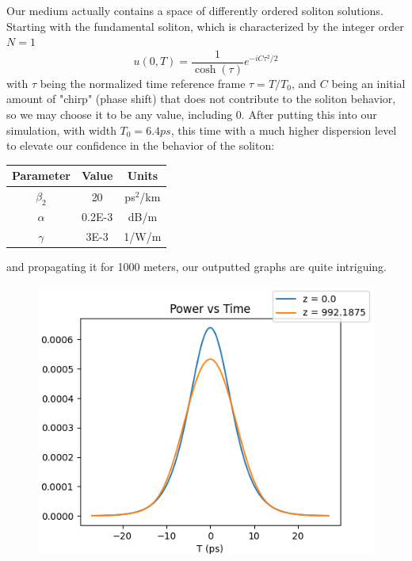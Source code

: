 \documentclass[10pt, a4paper, twocolumn]{article} %
\begin{document}
Our medium actually contains a space of differently ordered soliton solutions. Starting with the fundamental soliton, which is characterized by the integer order $N = 1$ \cite{Munaweera} 
$$u(0, T) = \frac{1}{\cosh(\tau)} e^{-iC\tau^2/2}$$
with $\tau$ being the normalized time reference frame $\tau = T/T_0$, and $C$ being an initial amount of "chirp" (phase shift) that does not contribute to the soliton behavior, so we may choose it to be any value, including $0$. After putting this into our simulation, with width $T_0 = 6.4 ps$, this time with a much higher dispersion level to elevate our confidence in the behavior of the soliton:
\begin{center}
\begin{tabular}{|c | c c|}
    \hline Parameter & Value & Units\\
    \hline
    $\beta_2$ & 20 & ps$^2$/km\\
    $\alpha$ & 0.2E-3 & dB/m\\
    $\gamma$ & 3E-3 & 1/W/m\\
    \hline
\end{tabular}
\end{center}
and propagating it for 1000 meters, our outputted graphs are quite intriguing.

\begin{figure}
    \includegraphics[width=\linewidth]{plots/sechPowerFL.png}
    \caption{}
    \label{sechPowerFL}
\end{figure}
\end{document}
